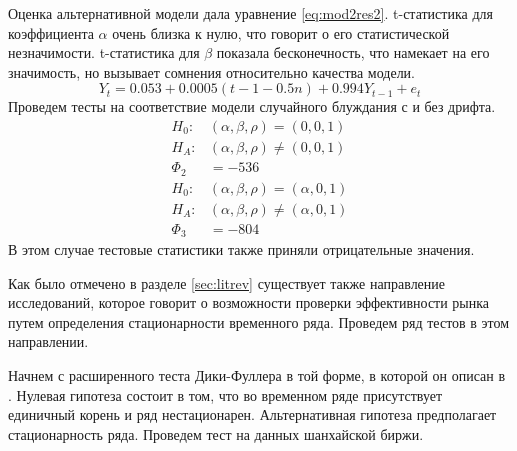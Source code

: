 \documentclass[a4paper,12pt]{article}
\begin{document}
Оценка альтернативной модели дала уравнение \ref{eq:mod2res2}. t-статистика для коэффициента $\alpha$ очень близка к нулю, что говорит о его статистической незначимости. t-статистика для $\beta$ показала бесконечность, что намекает на его значимость, но вызывает сомнения относительно качества модели.
\begin{equation}
  \label{eq:mod2res2}
  Y_t=0.053+0.0005(t-1-0.5n)+0.994Y_{t-1}+e_t
\end{equation}
Проведем тесты на соответствие модели случайного блуждания с и без дрифта.
\begin{align}
  H_0:&(\alpha, \beta, \rho)=(0,0,1)\\
  H_A:&(\alpha,\beta, \rho)\neq(0,0,1)\\
  \Phi_2&=-536\\
  H_0:&(\alpha, \beta, \rho)=(\alpha,0,1)\\
  H_A:&(\alpha,\beta, \rho)\neq(\alpha,0,1)\\
  \Phi_3&=-804
\end{align}
В этом случае тестовые статистики также приняли отрицательные значения.

Как было отмечено в разделе \ref{sec:litrev} существует также направление исследований, которое говорит о возможности проверки эффективности рынка путем определения стационарности временного ряда. Проведем ряд тестов в этом направлении.

Начнем с расширенного теста Дики-Фуллера в той форме, в которой он описан в \cite{fuller2009}. Нулевая гипотеза состоит в том, что во временном ряде присутствует единичный корень и ряд нестационарен. Альтернативная гипотеза предполагает стационарность ряда. Проведем тест на данных шанхайской биржи.
\end{document}

